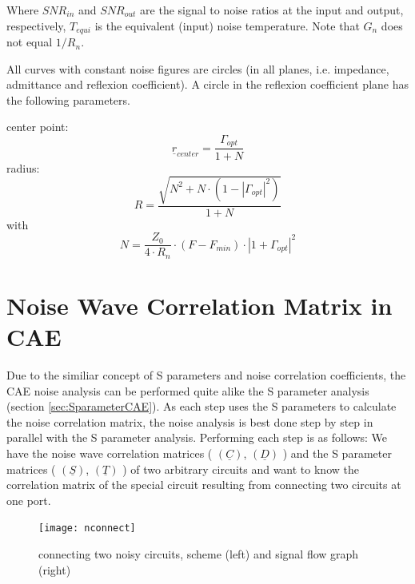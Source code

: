 \documentclass[10pt]{report}
\begin{document}
Where $SNR_{in}$ and $SNR_{out}$ are the signal to noise ratios at the
input and output, respectively, $T_{equi}$ is the equivalent (input)
noise temperature.  Note that $G_n$ does not equal $1/R_n$.

\addvspace{12pt}

All curves with constant noise figures are circles (in all planes,
i.e. impedance, admittance and reflexion coefficient).  A circle in
the reflexion coefficient plane has the following parameters.

\addvspace{12pt}

center point:
\begin{equation}
\underline{r}_{center} = \frac{\Gamma_{opt}}{1+N}
\end{equation}
radius:
\begin{equation}
R = \frac{\sqrt{N^2 + N\cdot(1-|\Gamma_{opt}|^2)}}{1+N}
\end{equation}
with
\begin{equation}
N = \frac{Z_0}{4\cdot R_n}\cdot (F-F_{min})\cdot |1+\Gamma_{opt}|^2
\end{equation}


\section{Noise Wave Correlation Matrix in CAE}

Due to the similiar concept of S parameters and noise correlation
coefficients, the CAE noise analysis can be performed quite alike the
S parameter analysis (section \ref{sec:SparameterCAE}). As each step
uses the S parameters to calculate the noise correlation matrix, the
noise analysis is best done step by step in parallel with the S
parameter analysis.  Performing each step is as follows: We have the
noise wave correlation matrices ( $(\underline{C})$, $(\underline{D})$
) and the S parameter matrices ( $(\underline{S})$, $(\underline{T})$
) of two arbitrary circuits and want to know the correlation matrix of
the special circuit resulting from connecting two circuits at one
port.

\begin{figure}[ht]
\begin{center}
\texttt{[image: nconnect]}
\end{center}
\caption{connecting two noisy circuits, scheme (left) and signal flow graph (right)}
\label{fig:nconnect}
\end{figure}
\FloatBarrier
\end{document}

